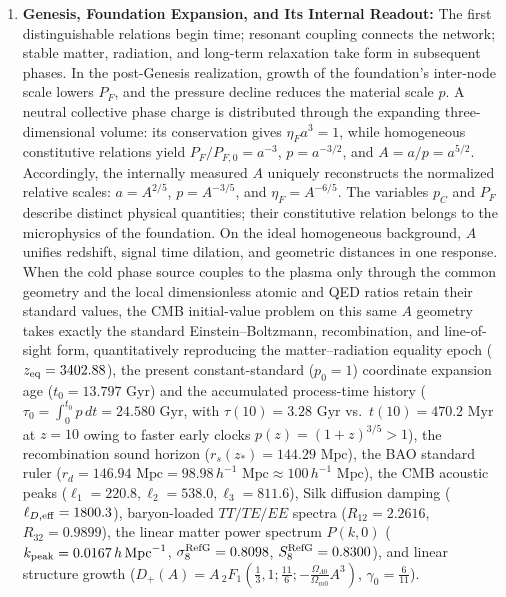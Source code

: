 \documentclass[11pt,a4paper]{article}
\begin{document}
\begin{enumerate}[label=\arabic*.]
\item \textbf{Genesis, Foundation Expansion, and Its Internal Readout:} The first distinguishable relations begin time; resonant coupling connects the network; stable matter, radiation, and long-term relaxation take form in subsequent phases. In the post-Genesis realization, growth of the foundation's inter-node scale lowers $P_F$, and the pressure decline reduces the material scale $p$. A neutral collective phase charge is distributed through the expanding three-dimensional volume: its conservation gives $\eta_Fa^3=1$, while homogeneous constitutive relations yield $P_F/P_{F,0}=a^{-3}$, $p=a^{-3/2}$, and $A=a/p=a^{5/2}$. Accordingly, the internally measured $A$ uniquely reconstructs the normalized relative scales: $a=A^{2/5}$, $p=A^{-3/5}$, and $\eta_F=A^{-6/5}$. The variables $p_C$ and $P_F$ describe distinct physical quantities; their constitutive relation belongs to the microphysics of the foundation. On the ideal homogeneous background, $A$ unifies redshift, signal time dilation, and geometric distances in one response. When the cold phase source couples to the plasma only through the common geometry and the local dimensionless atomic and QED ratios retain their standard values, the CMB initial-value problem on this same $A$ geometry takes exactly the standard Einstein--Boltzmann, recombination, and line-of-sight form, quantitatively reproducing the matter--radiation equality epoch ($z_{\rm eq} = 3402.88$), the present constant-standard ($p_0=1$) coordinate expansion age ($t_0 = 13.797\text{ Gyr}$) and the accumulated process-time history ($\tau_0 = \int_0^{t_0}p\,dt = 24.580\text{ Gyr}$, with $\tau(10) = 3.28\text{ Gyr}$ vs.\ $t(10) = 470.2\text{ Myr}$ at $z=10$ owing to faster early clocks $p(z) = (1+z)^{3/5} > 1$), the recombination sound horizon ($r_s(z_*) = 144.29\text{ Mpc}$), the BAO standard ruler ($r_d = 146.94\text{ Mpc} = 98.98\,h^{-1}\text{ Mpc} \approx 100\,h^{-1}\text{ Mpc}$), the CMB acoustic peaks ($\ell_1 = 220.8, \ell_2 = 538.0, \ell_3 = 811.6$), Silk diffusion damping ($\ell_{D,\rm eff} = 1800.3$), baryon-loaded $TT/TE/EE$ spectra ($R_{12} = 2.2616$, $R_{32} = 0.9899$), the linear matter power spectrum $P(k,0)$ ($k_{\rm peak} = 0.0167\,h\,\text{Mpc}^{-1}$, $\sigma_8^{\rm RefG} = 0.8098$, $S_8^{\rm RefG} = 0.8300$), and linear structure growth ($D_+(A) = A\,{}_2F_1(\frac{1}{3}, 1; \frac{11}{6}; -\frac{\Omega_{\Lambda 0}}{\Omega_{m0}}A^3)$, $\gamma_0 = \frac{6}{11}$).

\end{enumerate}
\end{document}
